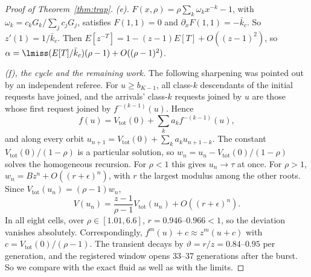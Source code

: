 \begin{proof}[Proof of Theorem~\ref{thm:trap}]
\emph{(e).} $F(x,\rho)=\rho\sum_k\omega_kx^{-k}-1$, with $\omega_k=c_kG_k/\sum_jc_jG_j$, satisfies $F(1,1)=0$ and
$\partial_xF(1,1)=-\bar k_c$. So $z'(1)=1/\bar k_c$. Then $E[z^{-T}]=1-(z-1)E[T]+O((z-1)^2)$, so
$\alpha=\lmiss(E[T]/\bar k_c)(\rho-1)+O((\rho-1)^2)$.

\emph{(f), the cycle and the remaining work.} The following sharpening was pointed out by an independent referee. For
$u\ge b_{K-1}$, all class-$k$ descendants of the initial requests have joined, and the arrivals' class-$k$ requests joined
by $u$ are those whose first request joined by $f^{-(k-1)}(u)$. Hence
\[
f(u)=V_{\mathrm{tot}}(0)+\sum_ka_kf^{-(k-1)}(u),
\]
and along every orbit $u_{n+1}=V_{\mathrm{tot}}(0)+\sum_ka_ku_{n+1-k}$. The constant $V_{\mathrm{tot}}(0)/(1-\rho)$ is a
particular solution, so $w_n=u_n-V_{\mathrm{tot}}(0)/(1-\rho)$ solves the homogeneous recursion. For $\rho<1$ this gives
$u_n\to\tau$ at once. For $\rho>1$, $w_n=Bz^n+O((r+\epsilon)^n)$, with $r$ the largest modulus among the other roots. Since
$V_{\mathrm{tot}}(u_n)=(\rho-1)w_n$,
\[
V(u_n)=\frac{z-1}{\rho-1}V_{\mathrm{tot}}(u_n)+O((r+\epsilon)^n).
\]
In all eight cells, over $\rho\in[1.01,6.6]$, $r=0.946$--$0.966<1$, so the deviation vanishes absolutely. Correspondingly,
$f^m(u)+c\approx z^m(u+c)$ with $c=V_{\mathrm{tot}}(0)/(\rho-1)$. The transient decays by $\vartheta=r/z=0.84$--$0.95$ per
generation, and the registered window opens 33--37 generations after the burst. So we compare with the exact fluid as well
as with the limits.
\end{proof}

